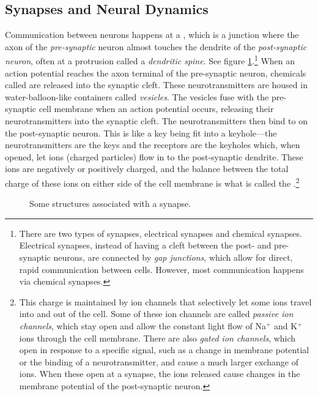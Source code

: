 \subsection{Synapses and Neural Dynamics}\label{simpleNeuralDynamics}

Communication between neurons happens at a , which is a junction where the axon of the \emph{pre-synaptic} neuron almost touches the dendrite of the \emph{post-synaptic neuron}, often at a protrusion called a \emph{dendritic spine}. See figure \ref{f:synapse}.\footnote{There are two types of synapses, electrical synapses and chemical synapses. Electrical synapses, instead of having a cleft between the post- and pre-synaptic neurons, are connected by \emph{gap junctions}, which allow for direct, rapid communication between cells. However, most communication happens via chemical synapses.}  When an action potential reaches the axon terminal of the pre-synaptic neuron, chemicals called  are released into the synaptic cleft. These neurotransmitters are housed in water-balloon-like containers called \emph{vesicles}. The vesicles fuse with the pre-synaptic cell membrane when an action potential occurs, releasing their neurotransmitters into the synaptic cleft. The neurotransmitters then bind to  on the post-synaptic neuron. This is like a key being fit into a keyhole---the neurotransmitters are the keys and the receptors are the keyholes which, when opened, let ions (charged particles) flow in to the post-synaptic dendrite. These ions are negatively or positively charged, and the balance between the total charge of these ions on either side of the cell membrane is what is called the .\footnote{This charge is maintained by ion channels that selectively let some ions travel into and out of the cell. Some of these ion channels are called \emph{passive ion channels}, which stay open and allow the constant light flow of Na$^+$ and K$^+$ ions through the cell membrane. There are also \emph{gated ion channels}, which open in response to a specific signal, such as a change in membrane potential or the binding of a neurotransmitter, and cause a much larger exchange of ions. When these open at a synapse, the ions released cause changes in the membrane potential of the post-synaptic neuron.}

\begin{figure}[h]
\centering
{}
\caption[Pamela Payne.]{Some structures associated with a synapse.}
\label{f:synapse}
\end{figure}

